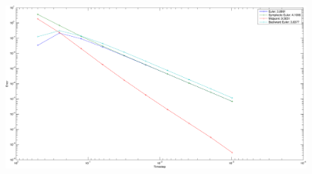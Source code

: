 \begin{figure}[]
	\begin{center}
		\includegraphics*[width=\textwidth]{graphics/ErrorCvgDamp0-crop.pdf}
	\end{center}
	\caption{}
	\label{fig:}
\end{figure}
